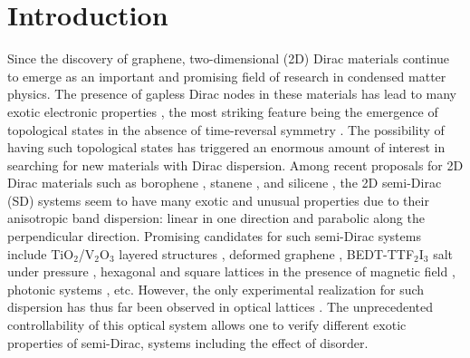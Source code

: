 \documentclass[aps,prb,showpacs,twocolumn,floats]{revtex4-1}
\begin{document}
\section{ Introduction} 
Since the discovery of graphene, two-dimensional (2D) Dirac materials continue to emerge as an important and promising field of research in condensed matter physics. The presence of gapless Dirac nodes in these materials has lead to many exotic electronic properties \cite{castro}, the most striking feature being the emergence of topological states in the absence of time-reversal symmetry \cite{haldane}. The possibility of having such topological states has triggered an enormous amount of interest in searching for new materials with Dirac dispersion. Among recent proposals for 2D Dirac materials such as borophene \cite{borophene}, stanene \cite{stanene}, and silicene \cite{silicene}, the 2D semi-Dirac (SD) systems\cite{footnote1} seem to have many exotic and unusual properties \cite{banerjee,nagaosa} due to their anisotropic band dispersion: linear in one direction and parabolic along the perpendicular direction. Promising candidates for such semi-Dirac systems include TiO$_2$/V$_2$O$_3$ layered structures \cite{padro}, deformed graphene \cite{montam}, BEDT-TTF$_2$I$_3$ salt under pressure \cite{kata}, hexagonal and square lattices in the presence of magnetic field \cite{diet,del}, photonic systems \cite{yu}, etc. However, the only experimental realization for such dispersion has thus far been observed in optical lattices \cite{tilman}. The unprecedented controllability of this optical system allows one to verify different exotic properties of semi-Dirac, systems including the effect of disorder.   
\end{document}
